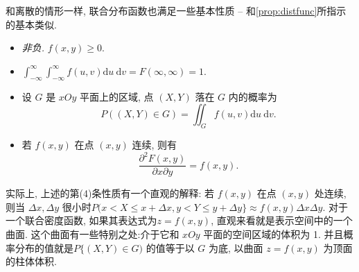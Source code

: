   和离散的情形一样, 联合分布函数也满足一些基本性质 -- 和\cref{prop:distfunc}所指示的基本类似. 
    \begin{itemize}
      \item \emph{非负.}  $f(x, y) \geq 0$.
      \item $\int_{-\infty}^{\infty} \int_{-\infty}^{\infty} f(u, v) \mathrm{d} u \mathrm{~d} v=F(\infty, \infty)=1$.
      \item 设 $G$ 是 $x O y$ 平面上的区域, 点 $(X, Y)$ 落在 $G$ 内的概率为
      $$
          P((X, Y) \in G)=\iint_G f(u, v) \mathrm{d} u \mathrm{~d} v .
      $$
      \item 若 $f(x, y)$ 在点 $(x, y)$ 连续, 则有
      $$
          \frac{\partial^2 F(x, y)}{\partial x \partial y}=f(x, y) .
      $$
    \end{itemize}

    实际上, 上述的第(4)条性质有一个直观的解释: 若 $f(x, y)$ 在点 $(x, y)$ 处连续, 则当 $\Delta x, \Delta y$ 很小时$P(x<X \leq x+\Delta x, y<Y \leq y+\Delta y\} \approx f(x, y) \Delta x \Delta y$. 对于一个联合密度函数, 如果其表达式为$z=f(x, y)$, 直观来看就是表示空间中的一个曲面. 这个曲面有一些特别之处:介于它和 $x O y$ 平面的空间区域的体积为 1. 并且概率分布的值就是$P\{(X, Y) \in G)$ 的值等于以 $G$ 为底, 以曲面 $z=f(x, y)$ 为顶面的柱体体积.

